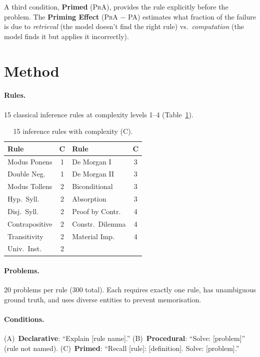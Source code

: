 \documentclass{article}
\newcommand{\pa}{\textsc{PA}}
\newcommand{\pra}{\textsc{PrA}}
\begin{document}
A third condition, \textbf{Primed} (\pra{}), provides the rule
explicitly before the problem.
The \textbf{Priming Effect} (\pra{} $-$ \pa{}) estimates what
fraction of the failure is due to \emph{retrieval} (the model
doesn't find the right rule) vs.\ \emph{computation} (the model
finds it but applies it incorrectly).

\section{Method}

\paragraph{Rules.}
15 classical inference rules at complexity levels 1--4
(Table~\ref{tab:rules}).

\begin{table}[t]
\centering
\small
\begin{tabular}{lc|lc}
\toprule
\textbf{Rule} & \textbf{C} & \textbf{Rule} & \textbf{C} \\
\midrule
Modus Ponens & 1 & De Morgan I & 3 \\
Double Neg. & 1 & De Morgan II & 3 \\
Modus Tollens & 2 & Biconditional & 3 \\
Hyp.\ Syll. & 2 & Absorption & 3 \\
Disj.\ Syll. & 2 & Proof by Contr. & 4 \\
Contrapositive & 2 & Constr.\ Dilemma & 4 \\
Transitivity & 2 & Material Imp. & 4 \\
Univ.\ Inst. & 2 & & \\
\bottomrule
\end{tabular}
\caption{15 inference rules with complexity (C).}
\label{tab:rules}
\end{table}

\paragraph{Problems.}
20 problems per rule (300 total). Each requires exactly one rule,
has unambiguous ground truth, and uses diverse entities to prevent
memorisation.

\paragraph{Conditions.}
(A)~\textbf{Declarative}: ``Explain [rule name].''
(B)~\textbf{Procedural}: ``Solve: [problem]'' (rule not named).
(C)~\textbf{Primed}: ``Recall [rule]: [definition]. Solve: [problem].''
\end{document}
